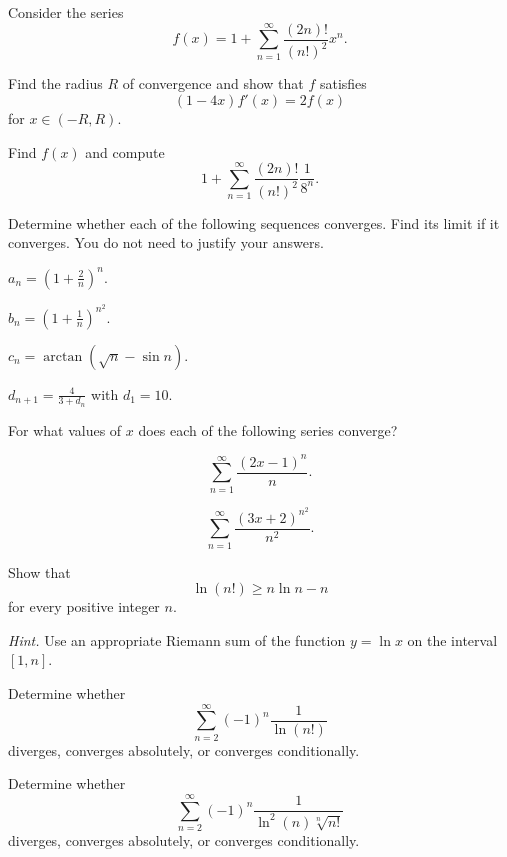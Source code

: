 \begin{problem}
Consider the series
\[
f(x)=1+\sum_{n=1}^{\infty}\frac{(2n)!}{(n!)^2}x^n.
\]
\begin{problemsubparts}
\item Find the radius $R$ of convergence and show that $f$ satisfies
\[
(1-4x)f'(x)=2f(x)
\]
for $x\in(-R, R)$.
\item Find $f(x)$ and compute
\[
1+\sum_{n=1}^{\infty}\frac{(2n)!}{(n!)^2}\frac{1}{8^n}.
\]
\end{problemsubparts}
\end{problem}

\begin{problem}
Determine whether each of the following sequences converges. Find its limit if it converges. You do not need to justify your answers.
\begin{problemsubparts}
\item $\displaystyle a_n=\left(1+\frac{2}{n}\right)^n$.
\item $\displaystyle b_n=\left(1+\frac{1}{n}\right)^{n^2}$.
\item $\displaystyle c_n=\arctan(\sqrt n-\sin n)$.
\item $\displaystyle d_{n+1}=\frac{4}{3+d_n}$ with $d_1=10$.
\end{problemsubparts}
\end{problem}

\begin{problem}
For what values of $x$ does each of the following series converge?
\begin{problemsubparts}
\item
\[
\sum_{n=1}^{\infty}\frac{(2x-1)^n}{n}.
\]
\item
\[
\sum_{n=1}^{\infty}\frac{(3x+2)^{n^2}}{n^2}.
\]
\end{problemsubparts}
\end{problem}

\begin{problem}
\begin{problemsubparts}
\item Show that
\[
\ln(n!)\ge n\ln n-n
\]
for every positive integer $n$.

\textit{Hint.} Use an appropriate Riemann sum of the function $y=\ln x$ on the interval $[1, n]$.
\item Determine whether
\[
\sum_{n=2}^{\infty}(-1)^n\frac{1}{\ln(n!)}
\]
diverges, converges absolutely, or converges conditionally.
\item Determine whether
\[
\sum_{n=2}^{\infty}(-1)^n
\frac{1}{\ln^2(n)\sqrt[n]{n!}}
\]
diverges, converges absolutely, or converges conditionally.
\end{problemsubparts}
\end{problem}

